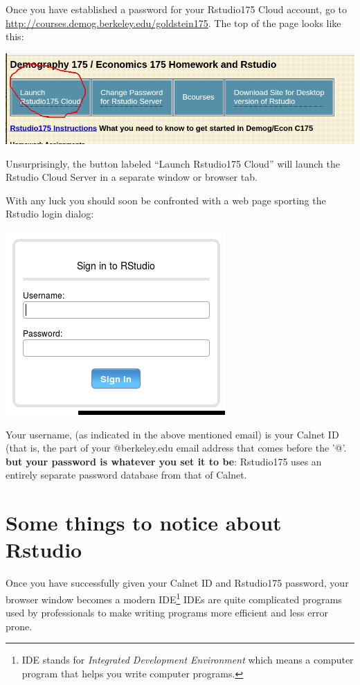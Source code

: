 \documentclass[11pt]{article}
\begin{document}
Once you have established a password for your Rstudio175 Cloud account, go to 
\url{http://courses.demog.berkeley.edu/goldstein175}.  The top of the page looks like this:

\includegraphics[scale=.5]{WebsiteTop}

Unsurprisingly, the button labeled ``Launch Rstudio175 Cloud'' will launch the Rstudio Cloud Server in a separate window or browser tab. 

\vspace{.5cm}

With any luck you should soon be confronted with a web page sporting the Rstudio login dialog:

\includegraphics[scale=.35]{RstudioSignin}

Your username, (as indicated in the above mentioned email) is your
Calnet ID (that is, the part of your @berkeley.edu email address that comes before the '@'. \textbf{but your password is whatever you set it to be}:
Rstudio175 uses an entirely separate password database from that of
Calnet.

\section{Some things to notice about Rstudio}

Once you have successfully given your Calnet ID and Rstudio175 password, your browser window becomes a modern IDE\footnote{IDE stands for \emph{Integrated Development Environment} which means a computer program that helps you write computer programs.} IDEs are quite complicated programs used by professionals to make writing programs more efficient and less error prone.
\end{document}
